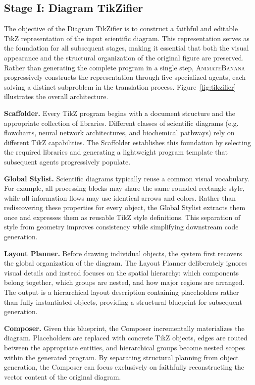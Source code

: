 \documentclass{article} %
\begin{document}
\subsection{Stage I: Diagram TikZifier}

The objective of the Diagram TikZifier is to construct a faithful and editable TikZ representation of the input scientific diagram. This representation serves as the foundation for all subsequent stages, making it essential that both the visual appearance and the structural organization of the original figure are preserved. Rather than generating the complete program in a single step, \textsc{AnimateBanana} progressively constructs the representation through five specialized agents, each solving a distinct subproblem in the translation process. Figure~\ref{fig:tikzifier} illustrates the overall architecture.

\noindent\textbf{Scaffolder.}
Every TikZ program begins with a document structure and the appropriate collection of libraries. Different classes of scientific diagrams (e.g. flowcharts, neural network architectures, and biochemical pathways) rely on different TikZ capabilities. The Scaffolder establishes this foundation by selecting the required libraries and generating a lightweight program template that subsequent agents progressively populate.

\noindent\textbf{Global Stylist.}
Scientific diagrams typically reuse a common visual vocabulary. For example, all processing blocks may share the same rounded rectangle style, while all information flows may use identical arrows and colors. Rather than rediscovering these properties for every object, the Global Stylist extracts them once and expresses them as reusable TikZ style definitions. This separation of style from geometry improves consistency while simplifying downstream code generation.

\noindent\textbf{Layout Planner.}
Before drawing individual objects, the system first recovers the global organization of the diagram. The Layout Planner deliberately ignores visual details and instead focuses on the spatial hierarchy: which components belong together, which groups are nested, and how major regions are arranged. The output is a hierarchical layout description containing placeholders rather than fully instantiated objects, providing a structural blueprint for subsequent generation.

\noindent\textbf{Composer.}
Given this blueprint, the Composer incrementally materializes the diagram. Placeholders are replaced with concrete TikZ objects, edges are routed between the appropriate entities, and hierarchical groups become nested scopes within the generated program. By separating structural planning from object generation, the Composer can focus exclusively on faithfully reconstructing the vector content of the original diagram.
\end{document}
